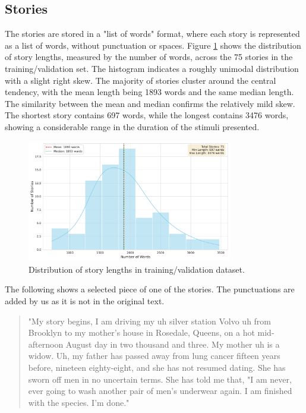 \documentclass[10pt,letterpaper]{article}
\begin{document}
\subsection{Stories}
The stories are stored in a "list of words" format, where each story is represented as a list of words, without punctuation or spaces. Figure \ref{fig:story_length} shows the distribution of story lengths, measured by the number of words, across the 75 stories in the training/validation set. The histogram indicates a roughly unimodal distribution with a slight right skew. The majority of stories cluster around the central tendency, with the mean length being 1893 words and the same median length. The similarity between the mean and median confirms the relatively mild skew. The shortest story contains 697 words, while the longest contains 3476 words, showing a considerable range in the duration of the stimuli presented.

\begin{figure}[ht]
    \centering
    \includegraphics[width=0.8\textwidth]{figs/story_length_distribution.pdf}
    \caption{Distribution of story lengths in training/validation dataset.}
    \label{fig:story_length}
\end{figure}

The following shows a selected piece of one of the stories. The punctuations are added by us as it is not in the original text.

\begin{quotation}
    "My story begins, I am driving my uh silver station Volvo uh from Brooklyn to my mother's house in Rosedale, Queens, on a hot mid-afternoon August day in two thousand and three. My mother uh is a widow. Uh, my father has passed away from lung cancer fifteen years before, nineteen eighty-eight, and she has not resumed dating. She has sworn off men in no uncertain terms. She has told me that, "I am never, ever going to wash another pair of men's underwear again. I am finished with the species. I'm done."
\end{quotation}
\end{document}
